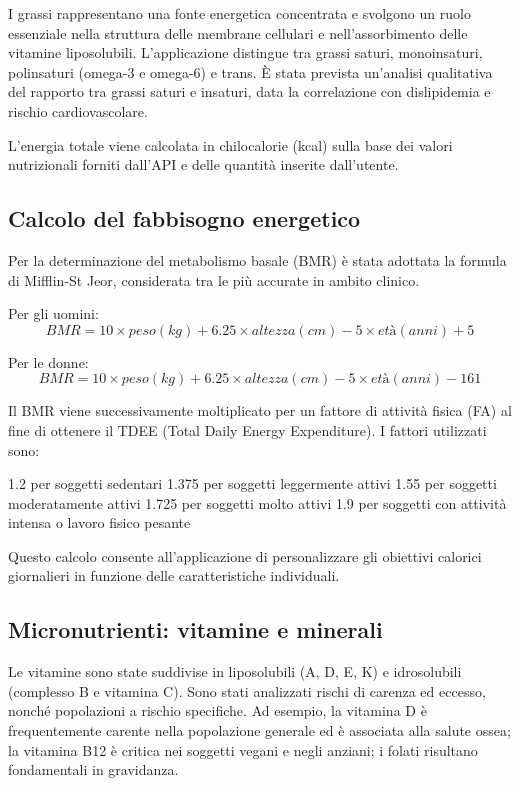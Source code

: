 \documentclass[a4paper,12pt]{article}
\begin{document}
    I grassi rappresentano una fonte energetica concentrata e svolgono un ruolo essenziale nella struttura delle membrane cellulari e nell’assorbimento delle vitamine liposolubili. L’applicazione distingue tra grassi saturi, monoinsaturi, polinsaturi (omega-3 e omega-6) e trans. È stata prevista un’analisi qualitativa del rapporto tra grassi saturi e insaturi, data la correlazione con dislipidemia e rischio cardiovascolare.

    L’energia totale viene calcolata in chilocalorie (kcal) sulla base dei valori nutrizionali forniti dall’API e delle quantità inserite dall’utente.

    \subsection{Calcolo del fabbisogno energetico}

    Per la determinazione del metabolismo basale (BMR) è stata adottata la formula di Mifflin-St Jeor, considerata tra le più accurate in ambito clinico.

    Per gli uomini:
    \[
        BMR = 10 \times peso (kg) + 6.25 \times altezza (cm) - 5 \times età (anni) + 5
    \]

    Per le donne:
    \[
        BMR = 10 \times peso (kg) + 6.25 \times altezza (cm) - 5 \times età (anni) - 161
    \]

    Il BMR viene successivamente moltiplicato per un fattore di attività fisica (FA) al fine di ottenere il TDEE (Total Daily Energy Expenditure). I fattori utilizzati sono:

    1.2 per soggetti sedentari
    1.375 per soggetti leggermente attivi
    1.55 per soggetti moderatamente attivi
    1.725 per soggetti molto attivi
    1.9 per soggetti con attività intensa o lavoro fisico pesante

    Questo calcolo consente all’applicazione di personalizzare gli obiettivi calorici giornalieri in funzione delle caratteristiche individuali.

    \subsection{Micronutrienti: vitamine e minerali}

    Le vitamine sono state suddivise in liposolubili (A, D, E, K) e idrosolubili (complesso B e vitamina C).
    Sono stati analizzati rischi di carenza ed eccesso, nonché popolazioni a rischio specifiche. Ad esempio, la vitamina D è frequentemente carente nella popolazione generale ed è associata alla salute ossea; la vitamina B12 è critica nei soggetti vegani e negli anziani; i folati risultano fondamentali in gravidanza.
\end{document}
